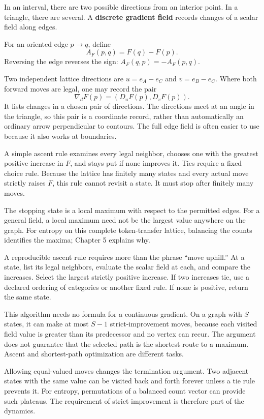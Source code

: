 \documentclass[11pt,oneside,openany]{book}
\theoremstyle{definition}
\theoremstyle{remark}
\numberwithin{equation}{chapter}
\begin{document}
In an interval, there are two possible directions from an interior point. In a triangle, there are several. A \textbf{discrete gradient field} records changes of a scalar field along edges.

For an oriented edge \(p\to q\), define \[A_F(p,q)=F(q)-F(p).\] Reversing the edge reverses the sign: \(A_F(q,p)=-A_F(p,q)\).

Two independent lattice directions are \(u=e_A-e_C\) and \(v=e_B-e_C\). Where both forward moves are legal, one may record the pair \[\nabla_dF(p)=(D_uF(p),D_vF(p)).\] It lists changes in a chosen pair of directions. The directions meet at an angle in the triangle, so this pair is a coordinate record, rather than automatically an ordinary arrow perpendicular to contours. The full edge field is often easier to use because it also works at boundaries.

A simple ascent rule examines every legal neighbor, chooses one with the greatest positive increase in \(F\), and stays put if none improves it. Ties require a fixed choice rule. Because the lattice has finitely many states and every actual move strictly raises \(F\), this rule cannot revisit a state. It must stop after finitely many moves.

The stopping state is a local maximum with respect to the permitted edges. For a general field, a local maximum need not be the largest value anywhere on the graph. For entropy on this complete token-transfer lattice, balancing the counts identifies the maxima; Chapter 5 explains why.

A reproducible ascent rule requires more than the phrase ``move uphill.'' At a state, list its legal neighbors, evaluate the scalar field at each, and compare the increases. Select the largest strictly positive increase. If two increases tie, use a declared ordering of categories or another fixed rule. If none is positive, return the same state.

This algorithm needs no formula for a continuous gradient. On a graph with \(S\) states, it can make at most \(S-1\) strict-improvement moves, because each visited field value is greater than its predecessor and no vertex can recur. The argument does not guarantee that the selected path is the shortest route to a maximum. Ascent and shortest-path optimization are different tasks.

Allowing equal-valued moves changes the termination argument. Two adjacent states with the same value can be visited back and forth forever unless a tie rule prevents it. For entropy, permutations of a balanced count vector can provide such plateaus. The requirement of strict improvement is therefore part of the dynamics.
\end{document}
